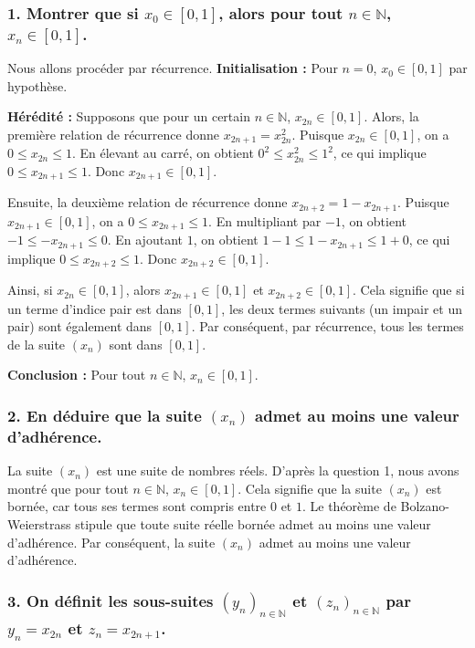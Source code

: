 \documentclass{report}
\begin{document}
\subsubsection*{1. Montrer que si $x_0 \in [0,1]$, alors pour tout $n \in \mathbb{N}$, $x_n \in [0, 1]$.}

Nous allons procéder par récurrence.
\textbf{Initialisation :} Pour $n=0$, $x_0 \in [0,1]$ par hypothèse.

\textbf{Hérédité :} Supposons que pour un certain $n \in \mathbb{N}$, $x_{2n} \in [0,1]$.
Alors, la première relation de récurrence donne $x_{2n+1} = x_{2n}^2$.
Puisque $x_{2n} \in [0,1]$, on a $0 \le x_{2n} \le 1$. En élevant au carré, on obtient $0^2 \le x_{2n}^2 \le 1^2$, ce qui implique $0 \le x_{2n+1} \le 1$. Donc $x_{2n+1} \in [0,1]$.

Ensuite, la deuxième relation de récurrence donne $x_{2n+2} = 1 - x_{2n+1}$.
Puisque $x_{2n+1} \in [0,1]$, on a $0 \le x_{2n+1} \le 1$.
En multipliant par $-1$, on obtient $-1 \le -x_{2n+1} \le 0$.
En ajoutant $1$, on obtient $1-1 \le 1-x_{2n+1} \le 1+0$, ce qui implique $0 \le x_{2n+2} \le 1$. Donc $x_{2n+2} \in [0,1]$.

Ainsi, si $x_{2n} \in [0,1]$, alors $x_{2n+1} \in [0,1]$ et $x_{2n+2} \in [0,1]$.
Cela signifie que si un terme d'indice pair est dans $[0,1]$, les deux termes suivants (un impair et un pair) sont également dans $[0,1]$.
Par conséquent, par récurrence, tous les termes de la suite $(x_n)$ sont dans $[0,1]$.

\textbf{Conclusion :} Pour tout $n \in \mathbb{N}$, $x_n \in [0, 1]$.

\subsubsection*{2. En déduire que la suite $(x_n)$ admet au moins une valeur d'adhérence.}

La suite $(x_n)$ est une suite de nombres réels.
D'après la question 1, nous avons montré que pour tout $n \in \mathbb{N}$, $x_n \in [0,1]$.
Cela signifie que la suite $(x_n)$ est bornée, car tous ses termes sont compris entre $0$ et $1$.
Le théorème de Bolzano-Weierstrass stipule que toute suite réelle bornée admet au moins une valeur d'adhérence.
Par conséquent, la suite $(x_n)$ admet au moins une valeur d'adhérence.

\subsubsection*{3. On définit les sous-suites $(y_n)_{n \in \mathbb{N}}$ et $(z_n)_{n \in \mathbb{N}}$ par $y_n = x_{2n}$ et $z_n = x_{2n+1}$.}
\end{document}
